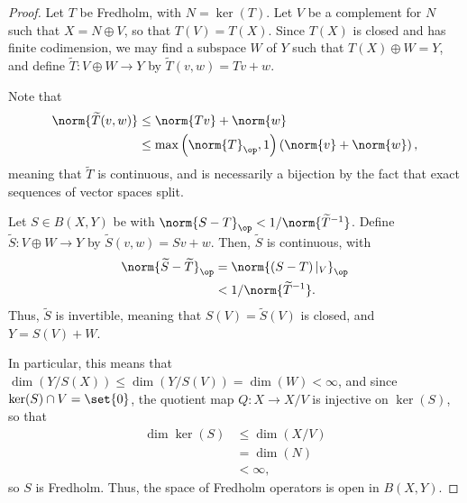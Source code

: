 \documentclass[10pt]{mypackage}
\begin{document}
\begin{proof}
  Let $T$ be Fredholm, with $N = \ker(T)$. Let $V$ be a complement for $N$ such that $X = N\oplus V$, so that $T(V) = T(X)$. Since $T(X)$ is closed and has finite codimension, we may find a subspace $W$ of $Y$ such that $T(X)\oplus W = Y$, and define $ \widetilde{T}\colon V\oplus W \rightarrow Y $ by $ \widetilde{T}(v,w) = Tv + w $.

  Note that
  \begin{align*}
    \norm{ \widetilde{T}(v,w) } &\leq \norm{Tv} + \norm{w}\\
                                &\leq \max\left(\norm{T}_{\op},1\right)\left( \norm{v} + \norm{w} \right),
  \end{align*}
  meaning that $ \widetilde{T} $ is continuous, and is necessarily a bijection by the fact that exact sequences of vector spaces split.

  Let $ S\in B(X,Y) $ be with $\norm{S-T}_{\op} < 1/\norm{ \widetilde{T}^{-1} }$. Define $ \widetilde{S}\colon V\oplus W \rightarrow Y $ by $ \widetilde{S}\left( v,w \right) = Sv + w $. Then, $ \widetilde{S} $ is continuous, with
  \begin{align*}
    \norm{ \widetilde{S} - \widetilde{T} }_{\op} &= \norm{ \left( S-T \right)|_{V} }_{\op}\\
                                                 &< 1/\norm{ \widetilde{T}^{-1} }.
  \end{align*}
  Thus, $ \widetilde{S} $ is invertible, meaning that $ S(V) = \widetilde{S}(V) $ is closed, and $Y = S(V) + W$.

  In particular, this means that $\dim(Y/S(X))\leq \dim(Y/S(V)) = \dim(W) < \infty$, and since $\ker(S)\cap V = \set{0}$, the quotient map $Q\colon X\rightarrow X/V$ is injective on $\ker(S)$, so that
  \begin{align*}
    \dim\ker(S) &\leq \dim(X/V)\\
                &= \dim(N)\\
                &< \infty,
  \end{align*}
  so $S$ is Fredholm. Thus, the space of Fredholm operators is open in $B(X,Y)$.


\end{proof}
\end{document}
